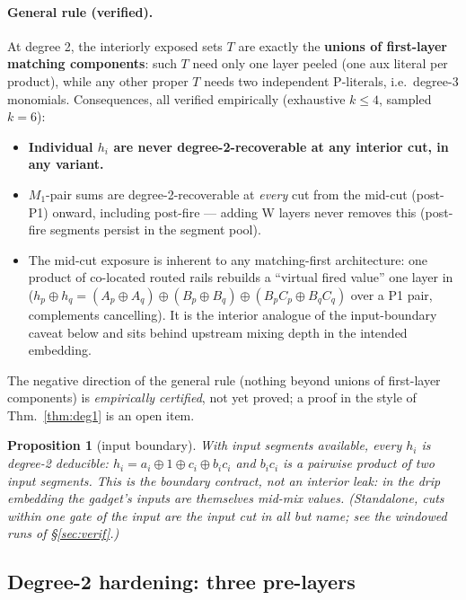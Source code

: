 \documentclass[11pt]{article}
\newtheorem{proposition}[theorem]{Proposition}
\theoremstyle{remark}
\begin{document}
\paragraph{General rule (verified).} At degree 2, the interiorly exposed sets $T$ are exactly
the \textbf{unions of first-layer matching components}: such $T$ need only one layer peeled (one
aux literal per product), while any other proper $T$ needs two independent P-literals, i.e.\
degree-3 monomials. Consequences, all verified empirically (exhaustive $k\le4$, sampled $k=6$):
\begin{itemize}
\item \textbf{Individual $h_i$ are never degree-2-recoverable at any interior cut, in any
variant.}
\item $M_1$-pair sums are degree-2-recoverable at \emph{every} cut from the mid-cut (post-P1)
onward, including post-fire --- adding W layers never removes this (post-fire segments persist
in the segment pool).
\item The mid-cut exposure is inherent to any matching-first architecture: one product of
co-located routed rails rebuilds a ``virtual fired value'' one layer in
($h_p\oplus h_q=(A_p\oplus A_q)\oplus(B_p\oplus B_q)\oplus(B_pC_p\oplus B_qC_q)$ over a P1 pair,
complements cancelling). It is the interior analogue of the input-boundary caveat below and sits
behind upstream mixing depth in the intended embedding.
\end{itemize}
The negative direction of the general rule (nothing beyond unions of first-layer components) is
\emph{empirically certified}, not yet proved; a proof in the style of Thm.~\ref{thm:deg1} is an
open item.

\begin{proposition}[input boundary]\label{prop:inputdeg2}
With input segments available, every $h_i$ is degree-2 deducible:
$h_i=a_i\oplus1\oplus c_i\oplus b_ic_i$ and $b_ic_i$ is a pairwise product of two input
segments. This is the boundary contract, not an interior leak: in the drip embedding the
gadget's inputs are themselves mid-mix values. (Standalone, cuts within one gate of the input
are the input cut in all but name; see the windowed runs of \S\ref{sec:verif}.)
\end{proposition}

\subsection{Degree-2 hardening: three pre-layers}\label{sec:hardening}
\end{document}
